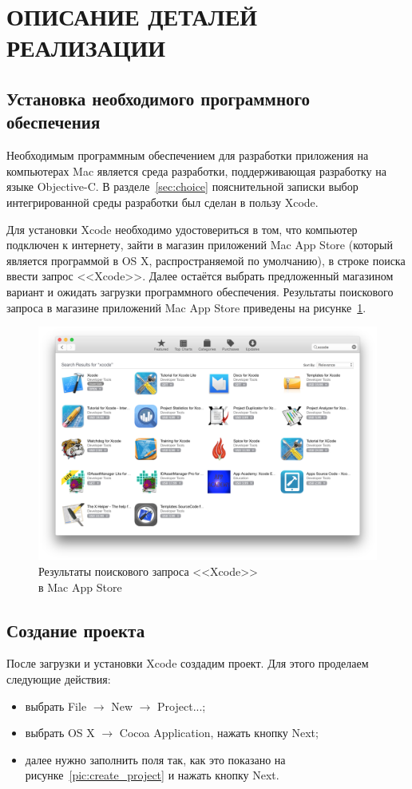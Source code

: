 \section[Описание деталей реализации]{ОПИСАНИЕ ДЕТАЛЕЙ РЕАЛИЗАЦИИ}
\label{sec:realization}

\subsection{Установка необходимого программного обеспечения}

Необходимым программным обеспечением для разработки приложения на
компьютерах Mac является среда разработки, поддерживающая разработку на
языке Objective-C. В разделе~\ref{sec:choice} пояснительной записки выбор
интегрированной среды разработки был сделан в пользу Xcode.

Для установки Xcode необходимо удостовериться в том, что компьютер подключен
к интернету, зайти в магазин приложений Mac App Store (который является
программой в OS X, распространяемой по умолчанию), в строке поиска ввести
запрос <<Xcode>>. Далее остаётся выбрать предложенный магазином вариант и
ожидать загрузки программного обеспечения. Результаты поискового запроса
в магазине приложений Mac App Store приведены на рисунке~\ref{pic:search_xcode}.
\begin{figure}[h!]
  \centering
  \includegraphics[width=150mm]{pic/search_xcode.png}
  \caption{Результаты поискового запроса <<Xcode>> \\ в Mac App Store}
  \label{pic:search_xcode}
\end{figure}


\subsection{Создание проекта}
После загрузки и установки Xcode создадим проект. Для этого проделаем
следующие действия:
\begin{itemize}
  \item выбрать File $\rightarrow$ New $\rightarrow$ Project...;
  \item выбрать OS X $\rightarrow$ Cocoa Application, нажать кнопку Next;
  \item далее нужно заполнить поля так, как это показано
    на рисунке~\ref{pic:create_project} и нажать кнопку Next.
\end{itemize}


